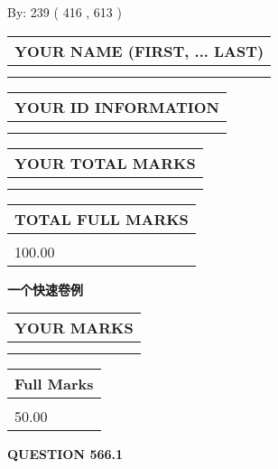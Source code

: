 \documentclass{ctexart}
\begin{document}
   
\hspace{1.0in} By: 
 239 ( 416 ,  613 )
   
   
   
   
\newpage 
\setcounter{page}{ 
   566001 } 
   
   
   
   
\noindent\begin{tabular}{|l|}
\hline
YOUR NAME (FIRST, ... LAST)  \\
\hline
 \\ 
 \\ 
\hline
\end{tabular}
\hspace{0.05in} \begin{tabular}{|l|}
\hline
 YOUR   ID   INFORMATION  \\
\hline
 \\ 
 \\ 
\hline
\end{tabular}
   
   
\vspace{0.2in}\noindent\begin{tabular}{|l|}
\hline
YOUR TOTAL MARKS  \\
\hline
 \\ 
 \\ 
\hline
\end{tabular}
\hspace{0.05in} \begin{tabular}{|l|}
\hline
TOTAL FULL MARKS  \\
\hline
 \\ 
100.00 \\
\hline
\end{tabular}
   
   
 \vspace{0.2in}
{\LARGE {\textbf{ 一个快速卷例}}}
   
   
  
\vspace{0.2in}
  
\noindent\begin{tabular}{|l|}
\hline
 YOUR MARKS  \\
\hline
 \\ 
 \\ 
\hline
\end{tabular}
\hspace{0.05in} \begin{tabular}{|l|}
\hline
 Full Marks  \\
\hline
 \\ 
50.00 \\
\hline
\end{tabular}
{\textbf{\Large{QUESTION
566.1 
}}}
  
\end{document}
